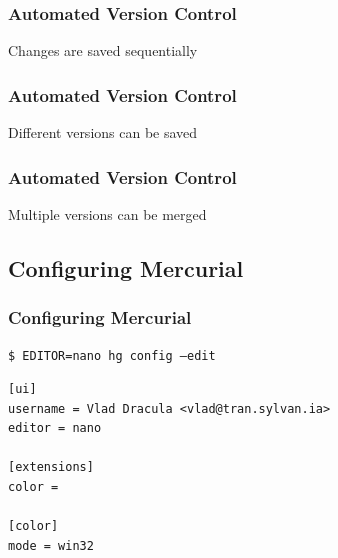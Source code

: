 \documentclass{beamer}
\begin{document}
\begin{frame}
\frametitle{Automated Version Control}
\begin{block}{Changes are saved sequentially}
\end{block}
\end{frame}

\begin{frame}
\frametitle{Automated Version Control}
\begin{block}{Different versions can be saved}
\end{block}
\end{frame}

\begin{frame}
\frametitle{Automated Version Control}
\begin{block}{Multiple versions can be merged}
\end{block}
\end{frame}

\subsection*{Configuring Mercurial}
\begin{frame}[fragile]
\frametitle{Configuring Mercurial}

\texttt{\$ EDITOR=nano hg config --edit} 

\begin{verbatim}
[ui]
username = Vlad Dracula <vlad@tran.sylvan.ia>
editor = nano

[extensions]
color =

[color]
mode = win32
\end{verbatim}

\end{frame}
\end{document}
